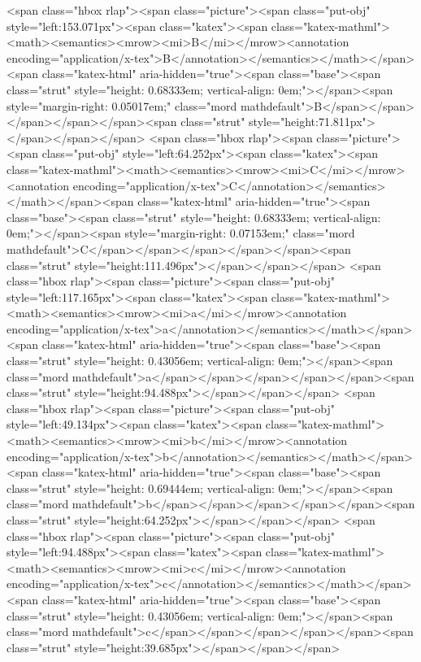 <span class="hbox rlap"><span class="picture"><span class="put-obj" style="left:153.071px"><span class="katex"><span class="katex-mathml"><math><semantics><mrow><mi>B</mi></mrow><annotation encoding="application/x-tex">B</annotation></semantics></math></span><span class="katex-html" aria-hidden="true"><span class="base"><span class="strut" style="height: 0.68333em; vertical-align: 0em;"></span><span style="margin-right: 0.05017em;" class="mord mathdefault">B</span></span></span></span></span><span class="strut" style="height:71.811px"></span></span></span>
<span class="hbox rlap"><span class="picture"><span class="put-obj" style="left:64.252px"><span class="katex"><span class="katex-mathml"><math><semantics><mrow><mi>C</mi></mrow><annotation encoding="application/x-tex">C</annotation></semantics></math></span><span class="katex-html" aria-hidden="true"><span class="base"><span class="strut" style="height: 0.68333em; vertical-align: 0em;"></span><span style="margin-right: 0.07153em;" class="mord mathdefault">C</span></span></span></span></span><span class="strut" style="height:111.496px"></span></span></span>
<span class="hbox rlap"><span class="picture"><span class="put-obj" style="left:117.165px"><span class="katex"><span class="katex-mathml"><math><semantics><mrow><mi>a</mi></mrow><annotation encoding="application/x-tex">a</annotation></semantics></math></span><span class="katex-html" aria-hidden="true"><span class="base"><span class="strut" style="height: 0.43056em; vertical-align: 0em;"></span><span class="mord mathdefault">a</span></span></span></span></span><span class="strut" style="height:94.488px"></span></span></span>
<span class="hbox rlap"><span class="picture"><span class="put-obj" style="left:49.134px"><span class="katex"><span class="katex-mathml"><math><semantics><mrow><mi>b</mi></mrow><annotation encoding="application/x-tex">b</annotation></semantics></math></span><span class="katex-html" aria-hidden="true"><span class="base"><span class="strut" style="height: 0.69444em; vertical-align: 0em;"></span><span class="mord mathdefault">b</span></span></span></span></span><span class="strut" style="height:64.252px"></span></span></span>
<span class="hbox rlap"><span class="picture"><span class="put-obj" style="left:94.488px"><span class="katex"><span class="katex-mathml"><math><semantics><mrow><mi>c</mi></mrow><annotation encoding="application/x-tex">c</annotation></semantics></math></span><span class="katex-html" aria-hidden="true"><span class="base"><span class="strut" style="height: 0.43056em; vertical-align: 0em;"></span><span class="mord mathdefault">c</span></span></span></span></span><span class="strut" style="height:39.685px"></span></span></span>
